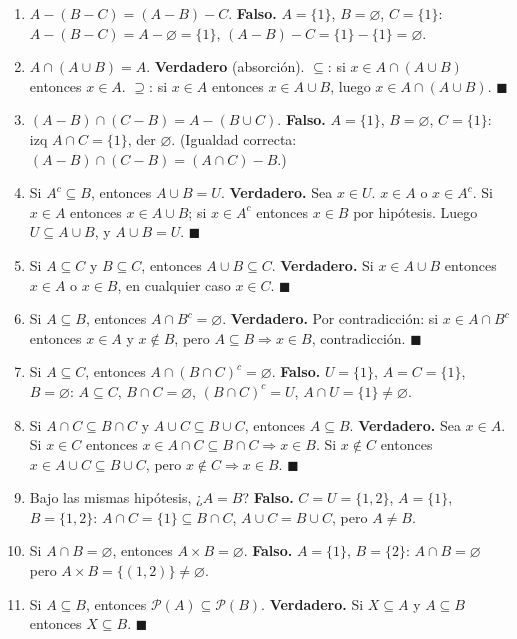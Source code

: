 \documentclass[12pt,a4paper]{article}
\begin{document}
\begin{enumerate}[label=5.,start=5]
  \item $A-(B-C)=(A-B)-C$. \textbf{Falso.} $A=\{1\}$, $B=\varnothing$, $C=\{1\}$: $A-(B-C)=A-\varnothing=\{1\}$, $(A-B)-C=\{1\}-\{1\}=\varnothing$.
  \item $A\cap(A\cup B)=A$. \textbf{Verdadero} (absorción). $\subseteq$: si $x\in A\cap(A\cup B)$ entonces $x\in A$. $\supseteq$: si $x\in A$ entonces $x\in A\cup B$, luego $x\in A\cap(A\cup B)$. $\blacksquare$
  \item $(A-B)\cap(C-B)=A-(B\cup C)$. \textbf{Falso.} $A=\{1\}$, $B=\varnothing$, $C=\{1\}$: izq $A\cap C=\{1\}$, der $\varnothing$. (Igualdad correcta: $(A-B)\cap(C-B)=(A\cap C)-B$.)
  \item Si $A^c\subseteq B$, entonces $A\cup B=U$. \textbf{Verdadero.} Sea $x\in U$. $x\in A$ o $x\in A^c$. Si $x\in A$ entonces $x\in A\cup B$; si $x\in A^c$ entonces $x\in B$ por hipótesis. Luego $U\subseteq A\cup B$, y $A\cup B=U$. $\blacksquare$
  \item Si $A\subseteq C$ y $B\subseteq C$, entonces $A\cup B\subseteq C$. \textbf{Verdadero.} Si $x\in A\cup B$ entonces $x\in A$ o $x\in B$, en cualquier caso $x\in C$. $\blacksquare$
  \item Si $A\subseteq B$, entonces $A\cap B^c=\varnothing$. \textbf{Verdadero.} Por contradicción: si $x\in A\cap B^c$ entonces $x\in A$ y $x\notin B$, pero $A\subseteq B\Rightarrow x\in B$, contradicción. $\blacksquare$
  \item Si $A\subseteq C$, entonces $A\cap(B\cap C)^c=\varnothing$. \textbf{Falso.} $U=\{1\}$, $A=C=\{1\}$, $B=\varnothing$: $A\subseteq C$, $B\cap C=\varnothing$, $(B\cap C)^c=U$, $A\cap U=\{1\}\neq\varnothing$.
  \item[H14.] Si $A\cap C\subseteq B\cap C$ y $A\cup C\subseteq B\cup C$, entonces $A\subseteq B$. \textbf{Verdadero.} Sea $x\in A$. Si $x\in C$ entonces $x\in A\cap C\subseteq B\cap C\Rightarrow x\in B$. Si $x\notin C$ entonces $x\in A\cup C\subseteq B\cup C$, pero $x\notin C\Rightarrow x\in B$. $\blacksquare$
  \item[H15.] Bajo las mismas hipótesis, ¿$A=B$? \textbf{Falso.} $C=U=\{1,2\}$, $A=\{1\}$, $B=\{1,2\}$: $A\cap C=\{1\}\subseteq B\cap C$, $A\cup C=B\cup C$, pero $A\neq B$.
  \item[16.] Si $A\cap B=\varnothing$, entonces $A\times B=\varnothing$. \textbf{Falso.} $A=\{1\}$, $B=\{2\}$: $A\cap B=\varnothing$ pero $A\times B=\{(1,2)\}\neq\varnothing$.
  \item[17.] Si $A\subseteq B$, entonces $\mathcal{P}(A)\subseteq\mathcal{P}(B)$. \textbf{Verdadero.} Si $X\subseteq A$ y $A\subseteq B$ entonces $X\subseteq B$. $\blacksquare$

\end{enumerate}
\end{document}
